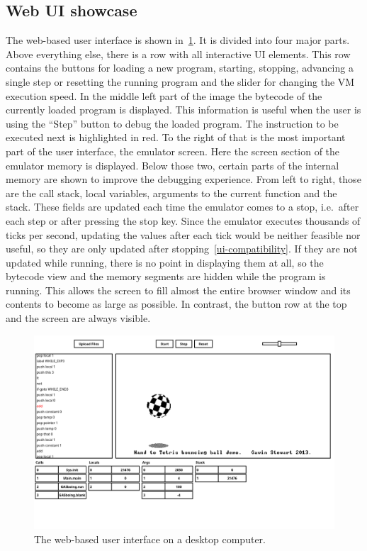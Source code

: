\subsection{Web UI showcase} \label{ui-showcase}
The web-based user interface is shown in~\cref{fig:ui-demo-desktop}.
It is divided into four major parts.
Above everything else, there is a row with all interactive UI elements.
This row contains the buttons for loading a new program, starting, stopping, advancing a single step or resetting the running program and the slider for changing the VM execution speed.
In the middle left part of the image the bytecode of the currently loaded program is displayed.
This information is useful when the user is using the ``Step'' button to debug the loaded program.
The instruction to be executed next is highlighted in red.
To the right of that is the most important part of the user interface, the emulator screen.
Here the screen section of the emulator memory is displayed.
Below those two, certain parts of the internal memory are shown to improve the debugging experience.
From left to right, those are the call stack, local variables, arguments to the current function and the stack.
These fields are updated each time the emulator comes to a stop, i.e.\ after each step or after pressing the stop key.
Since the emulator executes thousands of ticks per second, updating the values after each tick would be neither feasible nor useful, so they are only updated after stopping~\ref{ui-compatibility}.
If they are not updated while running, there is no point in displaying them at all, so the bytecode view and the memory segments are hidden while the program is running.
This allows the screen to fill almost the entire browser window and its contents to become as large as possible.
In contrast, the button row at the top and the screen are always visible.
\begin{center}
  \begin{figure}[ht]
    \centering
    \includegraphics[width=12cm]{fig/ui-demo-desktop.png}
    \caption{The web-based user interface on a desktop computer.}%
    \label{fig:ui-demo-desktop}
  \end{figure}
\end{center}
